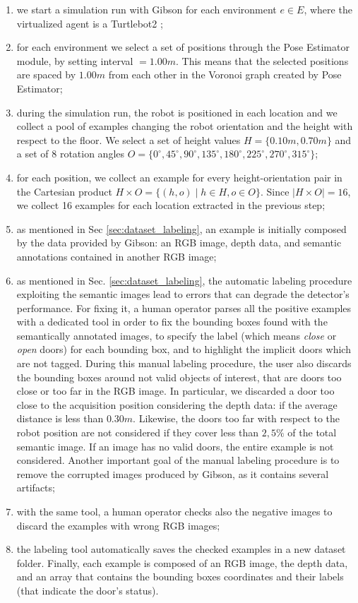 \begin{enumerate}
	\item we start a simulation run with Gibson for each environment $e \in E$, where the virtualized agent is a Turtlebot2 \cite{turtlebot2};
	\item for each environment we select a set of positions through the Pose Estimator module, by setting \textsf{interval} $= 1.00m$. This means that the selected positions are spaced by $1.00m$ from each other in the Voronoi graph created by Pose Estimator;
	\item during the simulation run, the robot is positioned in each location and we collect a pool of examples changing the robot orientation and the height with respect to the floor. We select a set of height values $H = \{0.10m, 0.70m\}$ and a set of 8 rotation angles $O = \{0^{\circ}, 45^{\circ}, 90^{\circ}, 135^{\circ}, 180^{\circ}, 225^{\circ}, 270^{\circ}, 315^{\circ}\}$;
	\item for each position, we collect an example for every height-orientation pair in the Cartesian product $H \times O = \{(h, o) \mid h \in H, o \in O\}$. Since $|H \times O| = 16$, we collect 16 examples for each location extracted in the previous step;
	\item as mentioned in Sec \ref{sec:dataset_labeling}, an example is initially composed by the data provided by Gibson: an RGB image, depth data, and semantic annotations contained in another RGB image;
	\item as mentioned in Sec. \ref{sec:dataset_labeling}, the automatic labeling procedure exploiting the semantic images lead to errors that can degrade  the detector's performance. For fixing it, a human operator parses all the positive examples with a dedicated tool in order to fix the bounding boxes found with the semantically annotated images, to specify the label (which means \textit{close} or \textit{open} doors) for each bounding box, and to highlight the implicit doors which are not tagged. During this manual labeling procedure, the user also discards the bounding boxes around not valid objects of interest, that are doors too close or too far in the RGB image. In particular, we discarded a door too close to the acquisition position considering the depth data: if the average distance is less than $0.30 m$. Likewise, the doors too far with respect to the robot position are not considered if they cover less than $2,5\%$ of the total semantic image. If an image has no valid doors, the entire example is not considered. Another important goal of the manual labeling procedure is to remove the corrupted images produced by Gibson, as it contains several artifacts;
	\item with the same tool, a human operator checks also the negative images to discard the examples with wrong RGB images; 
	\item the labeling tool automatically saves the checked examples in a new dataset folder. Finally, each example is composed of an RGB image, the depth data, and an array that contains the bounding boxes coordinates and their labels (that indicate the door's status). 
\end{enumerate}

